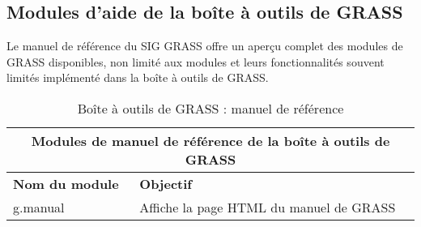 \subsection{Modules d'aide de la bo\^ite \`a outils de GRASS}

Le manuel de r\'ef\'erence du SIG GRASS offre un aper\c{c}u complet des modules de GRASS disponibles, non limit\'e aux modules et leurs fonctionnalit\'es souvent limit\'es impl\'ement\'e dans la bo\^ite \`a outils de GRASS.

\begin{table}[ht]
\centering
\caption{Bo\^ite \`a outils de GRASS : manuel de r\'ef\'erence}\medskip
 \begin{tabular}{|p{4cm}|p{12cm}|}
  \hline \multicolumn{2}{|c|}{\textbf{Modules de manuel de r\'ef\'erence de la bo\^ite \`a outils de GRASS}} \\
  \hline \textbf{Nom du module} & \textbf{Objectif} \\
  \hline g.manual & Affiche la page HTML du manuel de GRASS \\
\hline
\end{tabular}
\end{table}
